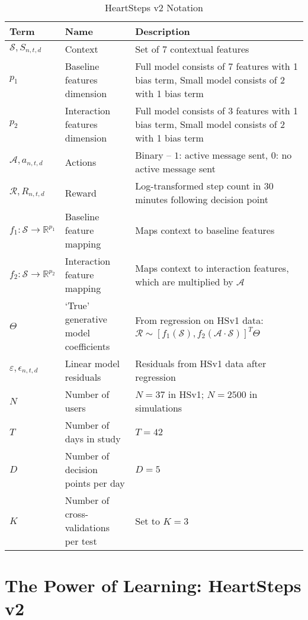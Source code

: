 	  \begin{table}
	 \caption{HeartSteps v2 Notation}
	 \label{Notation Table}
	 \centering \begin{tabular*}
	{0.987\textwidth}
	{|p{}|p{}|p{}|}
	\toprule
	Term & Name & Description \\
	\midrule
	$\mathcal{S},S_{n,t,d}$ & Context & Set of 7 contextual features     \\
	$p_1$ & Baseline features dimension & Full model consists of 7 features with 1 bias term, Small model consists of 2 with 1 bias term \\
	$p_2$ & Interaction features dimension & Full model consists of 3 features with 1 bias term, Small model consists of 2 with 1 bias term \\
	$\mathcal{A}, a_{n,t,d}$ & Actions &  Binary -- $1$: active message sent, $0$: no active message sent   \\
	$\mathcal{R}, R_{n,t,d}$ & Reward &  Log-transformed step count in $30$ minutes following decision point  \\
	$f_1 : \mathcal{S} \to \mathbb{R}^{p_1}$ & Baseline feature mapping & Maps context to baseline features \\
	$f_2 : \mathcal{S} \to \mathbb{R}^{p_2}$ & Interaction feature mapping & Maps context to interaction features, which are multiplied by $\mathcal{A}$ \\
	$\Theta$ & `True' generative model coefficients & From regression on HSv1 data:\newline $\mathcal{R} \sim [f_1(\mathcal{S}), f_2(\mathcal{A} \cdot \mathcal{S})]^T\Theta$ \\
	$\varepsilon, \epsilon_{n,t,d}$ & Linear model residuals & Residuals from HSv1 data after regression \\
	$N$ & Number of users  & $N = 37$ in HSv1; $N = 2500$ in simulations \\
	$T$ & Number of days in study & $T = 42$  \\
	$D$ & Number of decision points per day &  $D = 5$ \\
	$K$ & Number of cross-validations per test & Set to $K = 3$ 
	\\\bottomrule
	\end{tabular*}
	  \end{table}



\section{The Power of Learning: HeartSteps v2}

